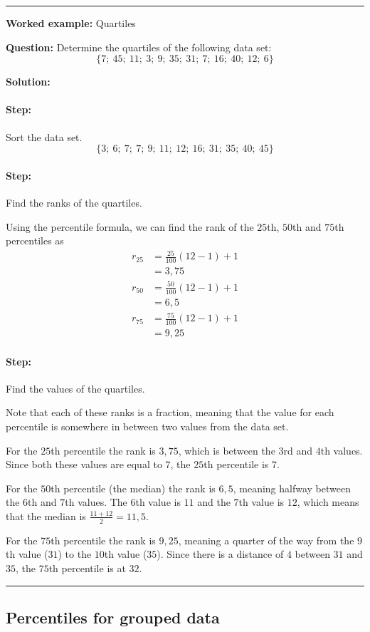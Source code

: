 \documentclass[a4paper,11pt]{report}
\newenvironment{wex}[3]%
{\rule{\linewidth}{0.5mm}
\textbf{Worked example:} #1

\textbf{Question:} #2

\textbf{Solution:} #3}%
{\rule{\linewidth}{0.5mm}}
\newcommand{\westep}[1]{\paragraph{Step:} #1}
\begin{document}
\begin{wex}{Quartiles}{
    Determine the quartiles of the following data set:
    \begin{equation}
      \{7;\ 45;\ 11;\ 3;\ 9;\ 35;\ 31;\ 7;\ 16;\ 40;\ 12;\ 6\}
    \end{equation}
}{
    \westep{Sort the data set.}
    \begin{equation}
      \{3;\ 6;\ 7;\ 7;\ 9;\ 11;\ 12;\ 16;\ 31;\ 35;\ 40;\ 45\}
    \end{equation}

    \westep{Find the ranks of the quartiles.}

    Using the percentile formula, we can find the rank of the $25$th,
    $50$th and $75$th percentiles as
    \begin{align}
      r_{25} &= \frac{25}{100}\left(12-1\right)+1 \\
            &= 3,75 \\
      r_{50} &= \frac{50}{100}\left(12-1\right)+1 \\
            &= 6,5 \\
      r_{75} &= \frac{75}{100}\left(12-1\right)+1 \\
            &= 9,25
    \end{align}

    \westep{Find the values of the quartiles.}

    Note that each of these ranks is a fraction, meaning that the
    value for each percentile is somewhere in between two values from
    the data set.

    For the $25$th percentile the rank is $3,75$, which is between
    the $3$rd and $4$th values. Since both these values are equal to
    $7$, the $25$th percentile is $7$.

    For the $50$th percentile (the median) the rank is $6,5$, meaning
    halfway between the $6$th and $7$th values. The $6$th value is
    $11$ and the $7$th value is $12$, which means that the median is
    $\frac{11+12}{2} = 11,5$.

    For the $75$th percentile the rank is $9,25$, meaning a quarter of
    the way from the $9$th value ($31$) to the $10$th value
    ($35$). Since there is a distance of $4$ between $31$ and $35$,
    the $75$th percentile is at $32$.

  }
\end{wex}

\subsection{Percentiles for grouped data}
\end{document}
